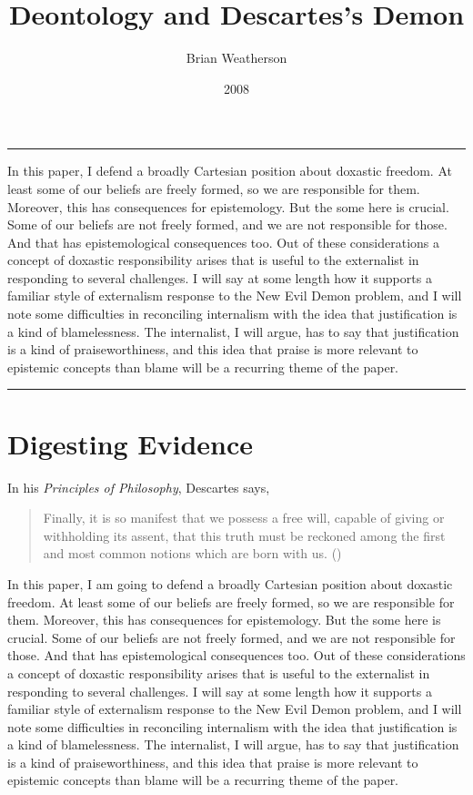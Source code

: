\documentclass[
  10pt,
  letterpaper,
  DIV=11,
  numbers=noendperiod,
  twoside]{scrartcl}
\title{Deontology and Descartes's Demon}
\author{Brian Weatherson}
\date{2008}
\renewenvironment{abstract}
 {\vspace{-1.25cm}
 \quotation\small\noindent\rule{\linewidth}{.5pt}\par\smallskip
 \noindent }
 {\par\noindent\rule{\linewidth}{.5pt}\endquotation}
\begin{document}
\maketitle
\begin{abstract}
In this paper, I defend a broadly Cartesian position about doxastic
freedom. At least some of our beliefs are freely formed, so we are
responsible for them. Moreover, this has consequences for epistemology.
But the some here is crucial. Some of our beliefs are not freely formed,
and we are not responsible for those. And that has epistemological
consequences too. Out of these considerations a concept of doxastic
responsibility arises that is useful to the externalist in responding to
several challenges. I will say at some length how it supports a familiar
style of externalism response to the New Evil Demon problem, and I will
note some difficulties in reconciling internalism with the idea that
justification is a kind of blamelessness. The internalist, I will argue,
has to say that justification is a kind of praiseworthiness, and this
idea that praise is more relevant to epistemic concepts than blame will
be a recurring theme of the paper.
\end{abstract}


\section{Digesting Evidence}\label{digesting-evidence}

In his \emph{Principles of Philosophy}, Descartes says,

\begin{quote}
Finally, it is so manifest that we possess a free will, capable of
giving or withholding its assent, that this truth must be reckoned among
the first and most common notions which are born with us.
()
\end{quote}

In this paper, I am going to defend a broadly Cartesian position about
doxastic freedom. At least some of our beliefs are freely formed, so we
are responsible for them. Moreover, this has consequences for
epistemology. But the some here is crucial. Some of our beliefs are not
freely formed, and we are not responsible for those. And that has
epistemological consequences too. Out of these considerations a concept
of doxastic responsibility arises that is useful to the externalist in
responding to several challenges. I will say at some length how it
supports a familiar style of externalism response to the New Evil Demon
problem, and I will note some difficulties in reconciling internalism
with the idea that justification is a kind of blamelessness. The
internalist, I will argue, has to say that justification is a kind of
praiseworthiness, and this idea that praise is more relevant to
epistemic concepts than blame will be a recurring theme of the paper.
\end{document}
